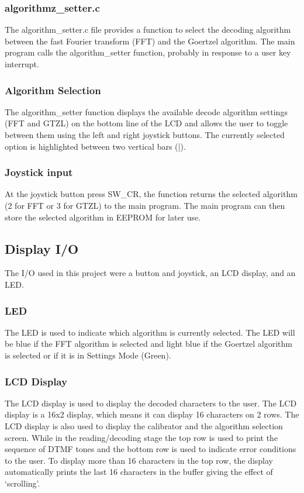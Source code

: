 \documentclass{cce2014-design}
\begin{document}
{{	  \subsubsection{algorithmz\_setter.c}
	  The algorithm\_setter.c file provides a function to select
	  the decoding algorithm between the fast Fourier transform
	  (FFT) and the Goertzel algorithm. The main program calls
	  the algorithm\_setter function, probably in response to a
	  user key interrupt.

	  \subsubsection{Algorithm Selection}
	  The algorithm\_setter function displays the available decode
	  algorithm settings (FFT and GTZL) on the bottom line of the
	  LCD and allows the user to toggle between them using the
	  left and right joystick buttons. The currently selected
	  option is highlighted between two vertical bars (|).

	  \subsubsection{Joystick input}
	  At the joystick button press SW\_CR, the function returns
	  the selected algorithm (2 for FFT or 3 for GTZL) to the
	  main program. The main program can then store the selected
	  algorithm in EEPROM for later use.
  }
  \subsection{Display I/O}
  {
	  The I/O used in this project were a button and joystick, an LCD
	  display, and an LED.

	  \subsubsection{LED}
	  The LED is used to indicate which algorithm is currently selected.
	  The LED will be blue if the FFT algorithm is selected and light blue
	  if the Goertzel algorithm is selected or if it is in Settings
	  Mode (Green).

	  \subsubsection{LCD Display}
	  The LCD display is used to display the decoded characters to
	  the user. The LCD display is a 16x2 display, which means it can
	  display 16
	  characters on 2 rows.
	  The LCD display is also used to display the calibrator and the
	  algorithm selection screen. While in the reading/decoding stage the
	  top row is
	  used to print
	  the sequence of DTMF tones and the bottom row is used to
	  indicate error conditions to the user. To display more than 16
	  characters in
	  the top row, the display
	  automatically prints the last 16 characters in the buffer
	  giving the effect of `scrolling'.

}}
\end{document}
